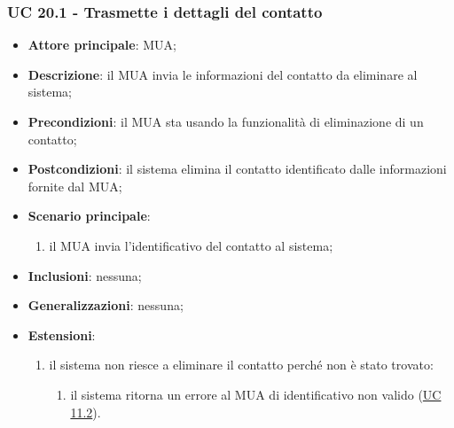 \subsubsection{UC 20.1 - Trasmette i dettagli del contatto} \label{sec:UC20.1}
    \begin{itemize}
        \item \textbf{Attore principale}: MUA;
        \item \textbf{Descrizione}: il MUA invia le informazioni del contatto da eliminare al sistema;
        \item \textbf{Precondizioni}: il MUA sta usando la funzionalità di eliminazione di un contatto;
        \item \textbf{Postcondizioni}: il sistema elimina il contatto identificato dalle informazioni fornite dal MUA;
        \item \textbf{Scenario principale}:
            \begin{enumerate}
                \item il MUA invia l'identificativo del contatto al sistema;
            \end{enumerate}
        \item \textbf{Inclusioni}: nessuna;
        \item \textbf{Generalizzazioni}: nessuna;
        \item \textbf{Estensioni}:
            \begin{enumerate}[label=\alph*.]
                \item il sistema non riesce a eliminare il contatto perché non è stato trovato:
                \begin{enumerate}[label=\arabic*.]
                    \item il sistema ritorna un errore al MUA di identificativo non valido (\hyperref[sec:UC11.2]{UC 11.2}).
                \end{enumerate}
            \end{enumerate}
    \end{itemize}


